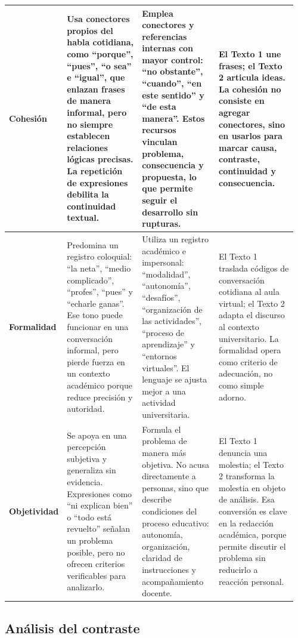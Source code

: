 \documentclass[
	spanish, %
	letterpaper, oneside
]{article}
\begin{document}
\begin{landscape}
\begin{longtable}{@{}p{0.14\linewidth}p{0.27\linewidth}p{0.27\linewidth}p{0.28\linewidth}@{}}
\textbf{Cohesión} &
Usa conectores propios del habla cotidiana, como ``porque'', ``pues'', ``o sea'' e ``igual'', que enlazan frases de manera informal, pero no siempre establecen relaciones lógicas precisas. La repetición de expresiones debilita la continuidad textual. &
Emplea conectores y referencias internas con mayor control: ``no obstante'', ``cuando'', ``en este sentido'' y ``de esta manera''. Estos recursos vinculan problema, consecuencia y propuesta, lo que permite seguir el desarrollo sin rupturas. &
El Texto 1 une frases; el Texto 2 articula ideas. La cohesión no consiste en agregar conectores, sino en usarlos para marcar causa, contraste, continuidad y consecuencia. \\
\midrule

\textbf{Formalidad} &
Predomina un registro coloquial: ``la neta'', ``medio complicado'', ``profes'', ``pues'' y ``echarle ganas''. Ese tono puede funcionar en una conversación informal, pero pierde fuerza en un contexto académico porque reduce precisión y autoridad. &
Utiliza un registro académico e impersonal: ``modalidad'', ``autonomía'', ``desafíos'', ``organización de las actividades'', ``proceso de aprendizaje'' y ``entornos virtuales''. El lenguaje se ajusta mejor a una actividad universitaria. &
El Texto 1 traslada códigos de conversación cotidiana al aula virtual; el Texto 2 adapta el discurso al contexto universitario. La formalidad opera como criterio de adecuación, no como simple adorno. \\
\midrule

\textbf{Objetividad} &
Se apoya en una percepción subjetiva y generaliza sin evidencia. Expresiones como ``ni explican bien'' o ``todo está revuelto'' señalan un problema posible, pero no ofrecen criterios verificables para analizarlo. &
Formula el problema de manera más objetiva. No acusa directamente a personas, sino que describe condiciones del proceso educativo: autonomía, organización, claridad de instrucciones y acompañamiento docente. &
El Texto 1 denuncia una molestia; el Texto 2 transforma la molestia en objeto de análisis. Esa conversión es clave en la redacción académica, porque permite discutir el problema sin reducirlo a reacción personal. \\
\end{longtable}
\endgroup
\end{landscape}

\pagestyle{fancy}

\subsection{Análisis del contraste}
\end{document}
